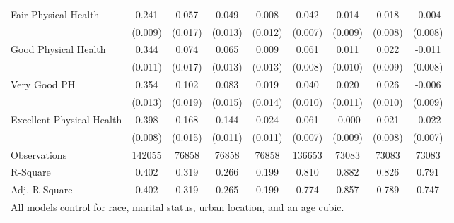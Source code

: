 \begin{table}
\begin{tabular}{l*{8}{c}}
Fair Physical Health&       0.241\sym{***}&       0.057\sym{***}&       0.049\sym{***}&       0.008         &       0.042\sym{***}&       0.014         &       0.018\sym{*}  &      -0.004         \\
                    &     (0.009)         &     (0.017)         &     (0.013)         &     (0.012)         &     (0.007)         &     (0.009)         &     (0.008)         &     (0.008)         \\
Good Physical Health&       0.344\sym{***}&       0.074\sym{***}&       0.065\sym{***}&       0.009         &       0.061\sym{***}&       0.011         &       0.022\sym{*}  &      -0.011         \\
                    &     (0.011)         &     (0.017)         &     (0.013)         &     (0.013)         &     (0.008)         &     (0.010)         &     (0.009)         &     (0.008)         \\
Very Good PH        &       0.354\sym{***}&       0.102\sym{***}&       0.083\sym{***}&       0.019         &       0.040\sym{***}&       0.020         &       0.026\sym{**} &      -0.006         \\
                    &     (0.013)         &     (0.019)         &     (0.015)         &     (0.014)         &     (0.010)         &     (0.011)         &     (0.010)         &     (0.009)         \\
Excellent Physical Health&       0.398\sym{***}&       0.168\sym{***}&       0.144\sym{***}&       0.024\sym{*}  &       0.061\sym{***}&      -0.000         &       0.021\sym{**} &      -0.022\sym{**} \\
                    &     (0.008)         &     (0.015)         &     (0.011)         &     (0.011)         &     (0.007)         &     (0.009)         &     (0.008)         &     (0.007)         \\
\midrule
Observations        &      142055         &       76858         &       76858         &       76858         &      136653         &       73083         &       73083         &       73083         \\
R-Square            &       0.402         &       0.319         &       0.266         &       0.199         &       0.810         &       0.882         &       0.826         &       0.791         \\
Adj. R-Square       &       0.402         &       0.319         &       0.265         &       0.199         &       0.774         &       0.857         &       0.789         &       0.747         \\
\bottomrule
\multicolumn{9}{l}{\small{All models control for race, marital status, urban location, and an age cubic.}} \\
\end{tabular}
\end{table}
